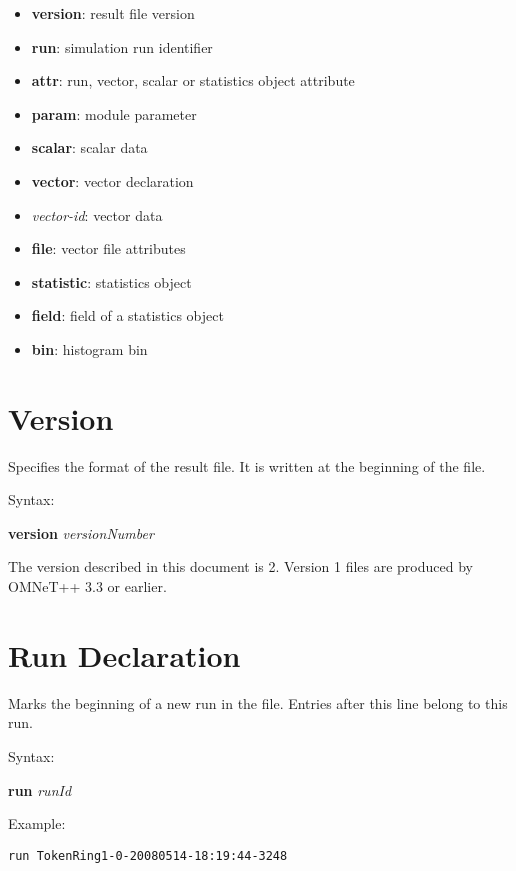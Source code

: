\begin{itemize}
    \item \textbf{version}: result file version
    \item \textbf{run}: simulation run identifier
    \item \textbf{attr}: run, vector, scalar or statistics object attribute
    \item \textbf{param}: module parameter
    \item \textbf{scalar}: scalar data
    \item \textbf{vector}: vector declaration
    \item \textit{vector-id}: vector data
    \item \textbf{file}: vector file attributes
    \item \textbf{statistic}: statistics object
    \item \textbf{field}: field of a statistics object
    \item \textbf{bin}: histogram bin
\end{itemize}



\section{Version}

Specifies the format of the result file. It is written at the beginning of the file.

Syntax:

\hspace{20mm} \textbf{version} \textit{versionNumber}

The version described in this document is 2. Version 1 files are produced
by OMNeT++ 3.3 or earlier.



\section{Run Declaration}

Marks the beginning of a new run in the file. Entries after this line
belong to this run.

Syntax:

\hspace{20mm} \textbf{run} \textit{runId}

Example:

\begin{verbatim}
run TokenRing1-0-20080514-18:19:44-3248
\end{verbatim}

